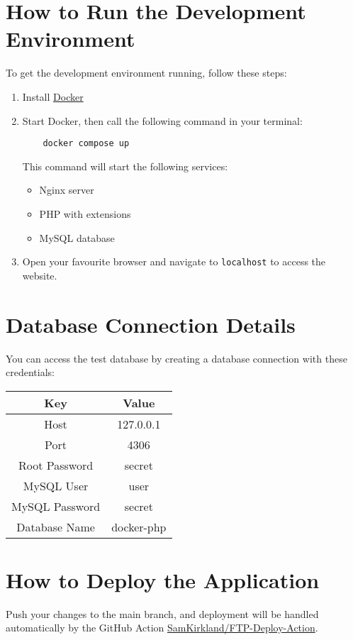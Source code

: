 \documentclass[12pt,a4paper]{report}
\begin{document}
\section{How to Run the Development Environment}
To get the development environment running, follow these steps:
\begin{enumerate}
    \item Install \href{https://www.docker.com/}{Docker}
    \item Start Docker, then call the following command in your terminal:
    \begin{verbatim}
    docker compose up
    \end{verbatim}
    This command will start the following services:
    \begin{itemize}
        \item Nginx server
        \item PHP with extensions
        \item MySQL database
    \end{itemize}
    \item Open your favourite browser and navigate to \texttt{localhost} to access the website.
\end{enumerate}

\section{Database Connection Details}
You can access the test database by creating a database connection with these credentials:
\begin{center}
\begin{tabular}{|c|c|}
\hline
\textbf{Key} & \textbf{Value} \\
\hline
Host & 127.0.0.1 \\
Port & 4306 \\
Root Password & secret \\
MySQL User & user \\
MySQL Password & secret \\
Database Name & docker-php \\
\hline
\end{tabular}
\end{center}

\section{How to Deploy the Application}
Push your changes to the main branch, and deployment will be handled automatically by the GitHub Action \href{https://github.com/marketplace/actions/ftp-deploy}{SamKirkland/FTP-Deploy-Action}.
\end{document}
